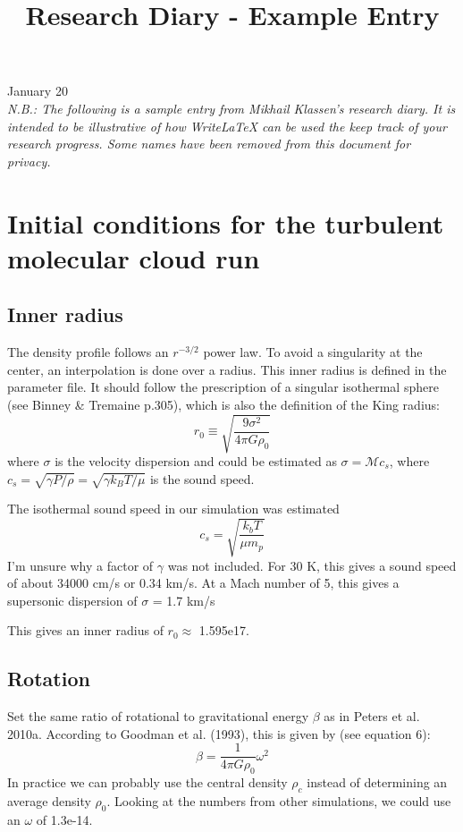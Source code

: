 \documentclass[11pt,letterpaper]{article}
\begin{document}
\univlogo

\title{Research Diary - Example Entry}

{\Huge January 20}\\[5mm]

\textit{N.B.: The following is a sample entry from Mikhail Klassen's research diary. It is intended to be illustrative of how WriteLaTeX can be used the keep track of your research progress. Some names have been removed from this document for privacy.}

\section*{Initial conditions for the turbulent molecular cloud run}

\subsection*{Inner radius}

The density profile follows an $r^{-3/2}$ power law. To avoid a singularity at the center, an interpolation is done over a radius. This inner radius is defined in the parameter file. It should follow the prescription of a singular isothermal sphere (see Binney \& Tremaine p.305), which is also the definition of the King radius:
\begin{equation}
r_0 \equiv \sqrt{\frac{9\sigma^2}{4\pi G\rho_0}}
\end{equation}
where $\sigma$ is the velocity dispersion and could be estimated as $\sigma = \mathcal{M} c_s$, where $c_s = \sqrt{\gamma P/\rho} = \sqrt{\gamma k_B T / \mu}$ is the sound speed.

The isothermal sound speed in our simulation was estimated
\begin{equation}
c_s = \sqrt{\frac{k_b T}{\mu m_p}}
\end{equation}
I'm unsure why a factor of $\gamma$ was not included. For 30 K, this gives a sound speed of about 34000 cm/s or 0.34 km/s. At a Mach number of 5, this gives a supersonic dispersion of $\sigma$ = 1.7 km/s

This gives an inner radius of $r_0 \approx$ 1.595e17. 

\subsection*{Rotation}

Set the same ratio of rotational to gravitational energy $\beta$ as in Peters et al. 2010a. According to Goodman et al. (1993), this is given by (see equation 6):
\begin{equation}
\beta = \frac{1}{4 \pi G \rho_0} \omega^2
\end{equation}
In practice we can probably use the central density $\rho_c$ instead of determining an average density $\rho_0$. Looking at the numbers from other simulations, we could use an $\omega$ of 1.3e-14.
\end{document}
